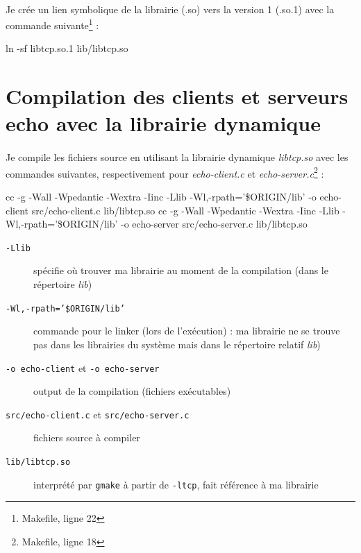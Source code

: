 \documentclass{article}
\begin{document}
    \paragraph{}
    Je crée un lien symbolique de la librairie (.so) vers la version 1 (.so.1) avec la commande suivante\footnote{Makefile, ligne 22} :
    \begin{verbatimtab}
        ln -sf libtcp.so.1 lib/libtcp.so
    \end{verbatimtab}
    
    \section{Compilation des clients et serveurs echo avec la librairie dynamique}
    \paragraph{}
    Je compile les fichiers source en utilisant la librairie dynamique \emph{libtcp.so} avec les commandes suivantes, respectivement pour \emph{echo-client.c} et \emph{echo-server.c}\footnote{Makefile, ligne 18} :
    \begin{verbatimtab}
        cc -g -Wall -Wpedantic -Wextra -Iinc -Llib -Wl,-rpath='\$ORIGIN/lib'
            -o echo-client src/echo-client.c lib/libtcp.so
        cc -g -Wall -Wpedantic -Wextra -Iinc -Llib -Wl,-rpath='\$ORIGIN/lib'
            -o echo-server src/echo-server.c lib/libtcp.so
    \end{verbatimtab}

    \begin{description}
        \item[\texttt{-Llib}] spécifie où trouver ma librairie au moment de la compilation (dans le répertoire \emph{lib})
        \item[\texttt{-Wl,-rpath='\$ORIGIN/lib'}] commande pour le linker (lors de l'exécution) : ma librairie ne se trouve pas dans les librairies du système mais dans le répertoire relatif \emph{lib})
        \item[\texttt{-o echo-client} et \texttt{-o echo-server}] output de la compilation (fichiers exécutables)
        \item[\texttt{src/echo-client.c} et \texttt{src/echo-server.c}] fichiers source à compiler
        \item[\texttt{lib/libtcp.so}] interprété par \texttt{gmake} à partir de \texttt{-ltcp}, fait référence à ma librairie
    \end{description}
\end{document}
